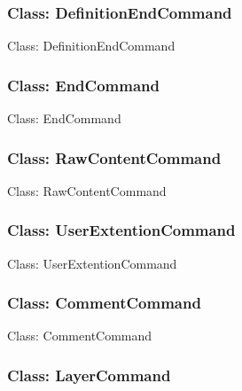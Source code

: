 \documentclass[11pt,twoside,openany,x11names,svgnames]{memoir}
\begin{document}
\subsubsection{Class: DefinitionEndCommand}\label{Class-DefinitionEndCommand}

Class: DefinitionEndCommand

\subsubsection{Class: EndCommand}\label{Class-EndCommand}

Class: EndCommand

\subsubsection{Class: RawContentCommand}\label{Class-RawContentCommand}

Class: RawContentCommand

\subsubsection{Class: UserExtentionCommand}\label{Class-UserExtentionCommand}

Class: UserExtentionCommand

\subsubsection{Class: CommentCommand}\label{Class-CommentCommand}

Class: CommentCommand

\subsubsection{Class: LayerCommand}\label{Class-LayerCommand}
\end{document}
